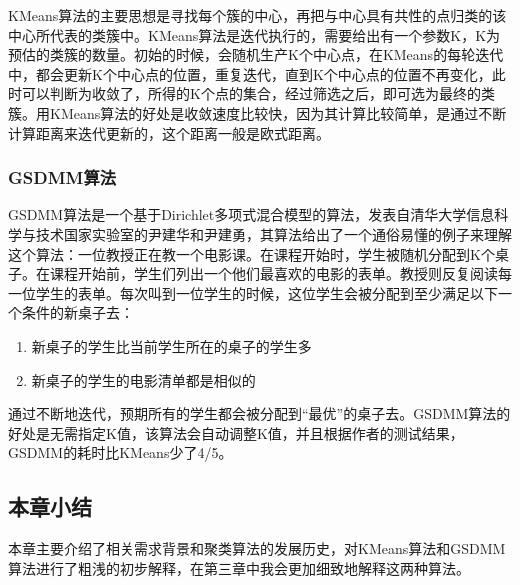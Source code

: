 KMeans算法的主要思想是寻找每个簇的中心，再把与中心具有共性的点归类的该中心所代表的类簇中。KMeans算法是迭代执行的，需要给出有一个参数K，K为预估的类簇的数量。初始的时候，会随机生产K个中心点，在KMeans的每轮迭代中，都会更新K个中心点的位置，重复迭代，直到K个中心点的位置不再变化，此时可以判断为收敛了，所得的K个点的集合，经过筛选之后，即可选为最终的类簇。用KMeans算法的好处是收敛速度比较快，因为其计算比较简单，是通过不断计算距离来迭代更新的，这个距离一般是欧式距离。

\subsubsection{GSDMM算法}
GSDMM算法是一个基于Dirichlet多项式混合模型的算法，发表自清华大学信息科学与技术国家实验室的尹建华和尹建勇\cite{Yin:2014}，其算法给出了一个通俗易懂的例子来理解这个算法：一位教授正在教一个电影课。在课程开始时，学生被随机分配到K个桌子。在课程开始前，学生们列出一个他们最喜欢的电影的表单。教授则反复阅读每一位学生的表单。每次叫到一位学生的时候，这位学生会被分配到至少满足以下一个条件的新桌子去：
\begin{enumerate}
	\item 新桌子的学生比当前学生所在的桌子的学生多
	\item 新桌子的学生的电影清单都是相似的
\end{enumerate}
通过不断地迭代，预期所有的学生都会被分配到“最优”的桌子去。GSDMM算法的好处是无需指定K值，该算法会自动调整K值，并且根据作者的测试结果，GSDMM的耗时比KMeans少了4/5。

\subsection{本章小结}

本章主要介绍了相关需求背景和聚类算法的发展历史，对KMeans算法和GSDMM算法进行了粗浅的初步解释，在第三章中我会更加细致地解释这两种算法。
